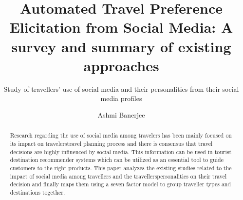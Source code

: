 \documentclass[sigconf]{acmart}
\begin{document}
\title{Automated Travel Preference Elicitation from Social Media: A survey and summary of existing approaches}
\subtitle{Study of travellers' use of social media and their personalities from their social media profiles}

\author{Ashmi Banerjee}

\renewcommand{\shortauthors}{Ashmi Banerjee}


\begin{abstract}
Research regarding the use of social media among travelers has been mainly focused on its impact on travelers\textquotesingle travel planning process and there is consensus that travel decisions are highly influenced by social media. This information can be used in tourist destination recommender systems which can be utilized as an essential tool to guide customers to the right products. This paper analyzes the existing studies related to the impact of social media among travellers and the travellers\textquotesingle personalities on their travel decision and finally maps them using a seven factor model to group traveller types and destinations together.


\end{abstract}


\maketitle






\end{document}
